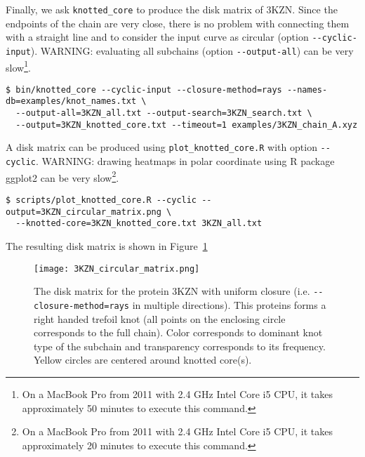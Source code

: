 Finally, we ask \lstinline{knotted_core} to produce the disk matrix of 3KZN. Since the endpoints of the chain are very close, there is no problem with connecting them with a straight line and to consider the input curve as circular (option \lstinline{--cyclic-input}). WARNING: evaluating all subchains (option \lstinline{--output-all}) can be very slow\footnote{On a MacBook Pro from 2011 with 2.4 GHz Intel Core i5 CPU, it takes approximately 50 minutes to execute this command.}.
\begin{lstlisting}
$ bin/knotted_core --cyclic-input --closure-method=rays --names-db=examples/knot_names.txt \
  --output-all=3KZN_all.txt --output-search=3KZN_search.txt \
  --output=3KZN_knotted_core.txt --timeout=1 examples/3KZN_chain_A.xyz
\end{lstlisting}

A disk matrix can be produced using \lstinline{plot_knotted_core.R} with option \lstinline{--cyclic}. WARNING: drawing heatmaps in polar coordinate using {\ttfamily R} package {\ttfamily ggplot2}\cite{wickham2009} can be very slow\footnote{On a MacBook Pro from 2011 with 2.4 GHz Intel Core i5 CPU, it takes approximately 20 minutes to execute this command.}.
\begin{lstlisting}
$ scripts/plot_knotted_core.R --cyclic --output=3KZN_circular_matrix.png \
  --knotted-core=3KZN_knotted_core.txt 3KZN_all.txt
\end{lstlisting}
The resulting disk matrix is shown in Figure~\ref{fig:3KZN:disk}
\begin{figure}[t]
\centering
\texttt{[image: 3KZN\_circular\_matrix.png]}
\caption{The disk matrix for the protein 3KZN with uniform closure (i.e. \lstinline{--closure-method=rays} in multiple directions). This proteins forms a right handed trefoil knot (all points on the enclosing circle corresponds to the full chain). Color corresponds to dominant knot type of the subchain and transparency corresponds to its frequency. Yellow circles are centered around knotted core(s).}\label{fig:3KZN:disk}
\end{figure}



\clearpage
